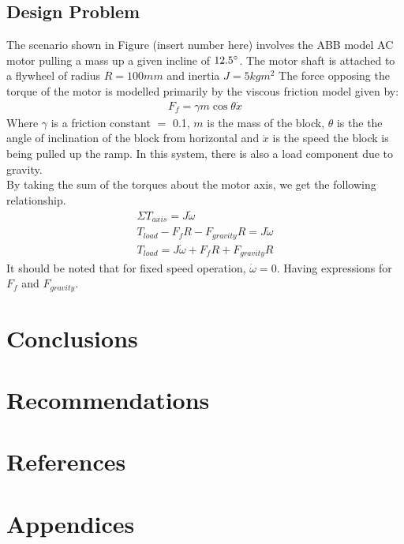 \documentclass[12pt]{report}
\begin{document}
		\section{Design Problem}
		The scenario shown in Figure (insert number here) involves the ABB model AC motor pulling 		a mass up a given incline of $12.5\degree$. The motor shaft is attached to a flywheel of 
		radius $R=100mm$ and inertia $J=5kgm^2$
		The force opposing the torque of the motor is modelled primarily by the viscous friction model 		given by:
		\begin{align*}
			F_f=\gamma m \cos \theta \dot{x}
		\end{align*}
		Where $\gamma$ is a friction constant $=$ 0.1, $m$ is the mass of the block, $\theta$ is the 
		the angle of inclination of the block from horizontal and $\dot{x}$ is the speed the block is
		being pulled up the ramp. In this system, there is also a load component due to gravity.\\
		By taking the sum of the torques about the motor axis, we get the following relationship.
		\begin{gather*}
			\Sigma T_{axis} = J\dot{\omega} \\
			T_{load} - F_fR - F_{gravity}R=J\dot{\omega}\\
			T_{load}=J\dot{\omega}+F_fR+F_{gravity}R
		\end{gather*}
		It should be noted that for fixed speed operation, $\dot{\omega}=0$. Having expressions for 
		$F_f$ and $F_{gravity}$.
	\chapter{Conclusions}
	
	\chapter{Recommendations}
	
	\chapter{References}
	
	\chapter{Appendices}
	
	
\end{document}
